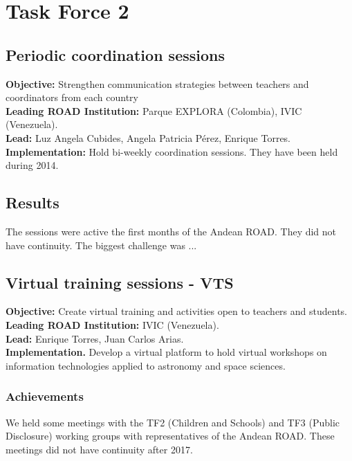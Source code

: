 \newpage
\section{Task Force 2}
\label{chapter3}

\subsection{Periodic coordination sessions}
\textbf{Objective:} Strengthen communication strategies between
teachers and coordinators from each country 
\\
\textbf{Leading ROAD Institution:} Parque EXPLORA (Colombia), IVIC
(Venezuela). 
\\
\textbf{Lead:} Luz Angela Cubides, Angela Patricia Pérez, Enrique Torres.
\\  
\textbf{Implementation:} Hold bi-weekly coordination sessions. They
have been held during 2014. 

\subsection{Results}
The sessions were active the first months of the Andean ROAD. 
They did not have continuity. 
The biggest challenge was ...





\subsection{Virtual training sessions - VTS}
\textbf{Objective:} Create virtual training and activities open to
teachers and students. 
\\
\textbf{Leading ROAD Institution:} IVIC (Venezuela).
\\
\textbf{Lead:} Enrique Torres, Juan Carlos Arias.
\\
\textbf{Implementation.} Develop a virtual platform to hold virtual
workshops on information technologies applied to astronomy and space
sciences. 

\subsubsection{Achievements}

We held some meetings with the TF2 (Children and Schools) and TF3
(Public Disclosure) working groups with representatives of the Andean
ROAD. 
These meetings did not have continuity after 2017.



